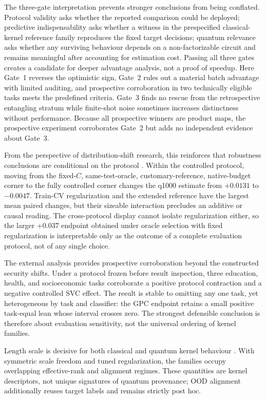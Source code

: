 \documentclass[referee,lineno,pdflatex,sn-vancouver-num]{sn-jnl}
\theoremstyle{thmstyleone}%
\theoremstyle{thmstyletwo}%
\theoremstyle{thmstylethree}%
\begin{document}
The three-gate interpretation prevents stronger conclusions from being conflated. Protocol validity asks whether the reported comparison could be deployed; predictive indispensability asks whether a witness in the prespecified classical-kernel reference family reproduces the fixed target decisions; quantum relevance asks whether any surviving behaviour depends on a non-factorizable circuit and remains meaningful after accounting for estimation cost. Passing all three gates creates a candidate for deeper advantage analysis, not a proof of speedup. Here Gate~1 reverses the optimistic sign, Gate~2 rules out a material batch advantage with limited auditing, and prospective corroboration in two technically eligible tasks meets the predefined criteria. Gate~3 finds no rescue from the retrospective entangling stratum while finite-shot noise sometimes increases distinctness without performance. Because all prospective winners are product maps, the prospective experiment corroborates Gate~2 but adds no independent evidence about Gate~3.

From the perspective of distribution-shift research, this reinforces that robustness conclusions are conditional on the protocol \cite{quinonero-candela2008datasetshift,gulrajani2021domainbed,koh2021wilds,yao2022wildtime}. Within the controlled protocol, moving from the fixed-$C$, same-test-oracle, customary-reference, native-budget corner to the fully controlled corner changes the q1000 estimate from $+0.0131$ to $-0.0047$. Train-CV regularization and the extended reference have the largest mean paired changes, but their sizeable interaction precludes an additive or causal reading. The cross-protocol display cannot isolate regularization either, so the larger $+0.037$ endpoint obtained under oracle selection with fixed regularization is interpretable only as the outcome of a complete evaluation protocol, not of any single choice.

The external analysis provides prospective corroboration beyond the constructed security shifts. Under a protocol frozen before result inspection, three education, health, and socioeconomic tasks corroborate a positive protocol contraction and a negative controlled SVC effect. The result is stable to omitting any one task, yet heterogeneous by task and classifier: the GPC endpoint retains a small positive task-equal lean whose interval crosses zero. The strongest defensible conclusion is therefore about evaluation sensitivity, not the universal ordering of kernel families.

Length scale is decisive for both classical and quantum kernel behaviour \cite{shaydulin2022bandwidth,canatar2023bandwidth}. With symmetric scale freedom and tuned regularization, the families occupy overlapping effective-rank and alignment regimes. These quantities are kernel descriptors, not unique signatures of quantum provenance; OOD alignment additionally reuses target labels and remains strictly post hoc.
\end{document}
